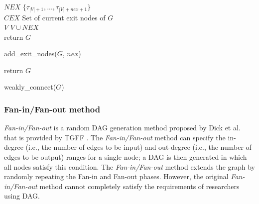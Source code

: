 \begin{algorithm}[t]
    {\footnotesize
    $NEX$ \la $\{\tau_{|V|+1}, ..., \tau_{|V|+nex+1}\}$ \\
    $CEX$ \la Set of current exit nodes of $G$ \\
    $V$ \la $V \cup NEX$ \\
    return $G$
    \caption{add\_exit\_nodes($G$, $nex$)}
    \label{alg: add_exit_nodes}
    }
\end{algorithm}


\begin{algorithm}[t]
    {\footnotesize
        return $G$
        \caption{weakly\_connect($G$)}
        \label{alg: weakly_connect}
    }
\end{algorithm}


\subsubsection{Fan-in/Fan-out method}
\label{sssec: fan_in_fan_out}

{\it Fan-in/Fan-out} is a random DAG generation method proposed by Dick et al. that is provided by TGFF \cite{tgff}.
The {\it Fan-in/Fan-out} method can specify the in-degree (i.e., the number of edges to be input) and out-degree (i.e., the number of edges to be output) ranges for a single node; a DAG is then generated in which all nodes satisfy this condition.
The {\it Fan-in/Fan-out} method extends the graph by randomly repeating the Fan-in and Fan-out phases.
However, the original {\it Fan-in/Fan-out} method cannot completely satisfy the requirements of researchers using DAG.

